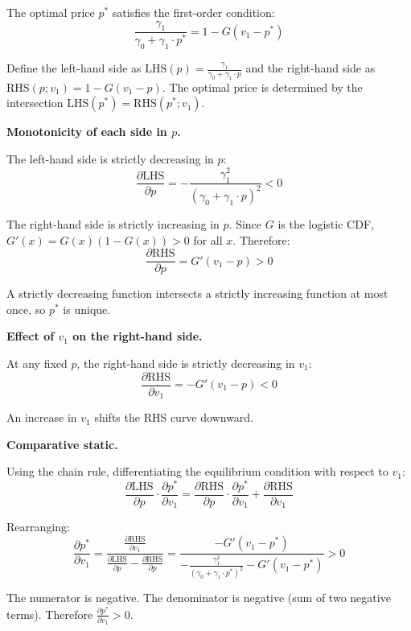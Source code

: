 
The optimal price $p^*$ satisfies the first-order condition:
\begin{equation}
    \frac{\gamma_1}{\gamma_0 + \gamma_1 \cdot p^*} = 1 - G(v_1 - p^*)
\end{equation}

Define the left-hand side as $\mathrm{LHS}(p) = \frac{\gamma_1}{\gamma_0 + \gamma_1 \cdot p}$ and the right-hand side as $\mathrm{RHS}(p; v_1) = 1 - G(v_1 - p)$. The optimal price is determined by the intersection $\mathrm{LHS}(p^*) = \mathrm{RHS}(p^*; v_1)$.

\textbf{Monotonicity of each side in $p$.}

The left-hand side is strictly decreasing in $p$:
\begin{equation}
    \frac{\partial \mathrm{LHS}}{\partial p} = -\frac{\gamma_1^2}{(\gamma_0 + \gamma_1 \cdot p)^2} < 0
\end{equation}

The right-hand side is strictly increasing in $p$. Since $G$ is the logistic CDF, $G'(x) = G(x)(1 - G(x)) > 0$ for all $x$. Therefore:
\begin{equation}
    \frac{\partial \mathrm{RHS}}{\partial p} = G'(v_1 - p) > 0
\end{equation}

A strictly decreasing function intersects a strictly increasing function at most once, so $p^*$ is unique.

\textbf{Effect of $v_1$ on the right-hand side.}

At any fixed $p$, the right-hand side is strictly decreasing in $v_1$:
\begin{equation}
    \frac{\partial \mathrm{RHS}}{\partial v_1} = -G'(v_1 - p) < 0
\end{equation}

An increase in $v_1$ shifts the RHS curve downward.

\textbf{Comparative static.}

Using the chain rule, differentiating the equilibrium condition with respect to $v_1$:
\begin{equation}
    \frac{\partial \mathrm{LHS}}{\partial p} \cdot \frac{\partial p^*}{\partial v_1} = \frac{\partial \mathrm{RHS}}{\partial p} \cdot \frac{\partial p^*}{\partial v_1} + \frac{\partial \mathrm{RHS}}{\partial v_1}
\end{equation}

Rearranging:
\begin{equation}
    \frac{\partial p^*}{\partial v_1} = \frac{\frac{\partial \mathrm{RHS}}{\partial v_1}}{\frac{\partial \mathrm{LHS}}{\partial p} - \frac{\partial \mathrm{RHS}}{\partial p}} = \frac{-G'(v_1 - p^*)}{-\frac{\gamma_1^2}{(\gamma_0 + \gamma_1 \cdot p^*)^2} - G'(v_1 - p^*)} > 0
\end{equation}

The numerator is negative. The denominator is negative (sum of two negative terms). Therefore $\frac{\partial p^*}{\partial v_1} > 0$.
